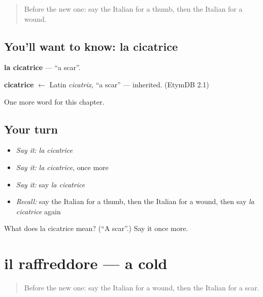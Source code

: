 \label{lesson:IT-C185-cicatrice}



\begin{quote}
Before the new one: say the Italian for a thumb, then the Italian for a wound.
\end{quote}

\subsection*{You'll want to know: la cicatrice}
\textbf{la cicatrice} — \textquotedblleft{}a scar\textquotedblright{}.

\begin{cousinweb}
\textbf{cicatrice} $\leftarrow$ Latin \emph{cicatrix}, \textquotedblleft{}a scar\textquotedblright{} — inherited. (EtymDB 2.1)
\end{cousinweb}

\begin{grammarlens}[title={What you've built}]
One more word for this chapter.
\end{grammarlens}

\subsection*{Your turn}
\begin{itemize}
\raggedright
  \item \emph{Say it:} \emph{la cicatrice}
  \item \emph{Say it:} \emph{la cicatrice}, once more
  \item \emph{Say it:} say \emph{la cicatrice}
  \item \emph{Recall:} say the Italian for a thumb, then the Italian for a wound, then say \emph{la cicatrice} again
\end{itemize}

\begin{tcolorbox}[breakable,colback=teal!4,colframe=teal!35!black,title={Before you move on}]
What does la cicatrice mean? (\textquotedblleft{}A scar\textquotedblright{}.) Say it once more.
\end{tcolorbox}
\section[il raffreddore]{il raffreddore — a cold}

\label{lesson:IT-C185-raffreddore}



\begin{quote}
Before the new one: say the Italian for a wound, then the Italian for a scar.
\end{quote}

